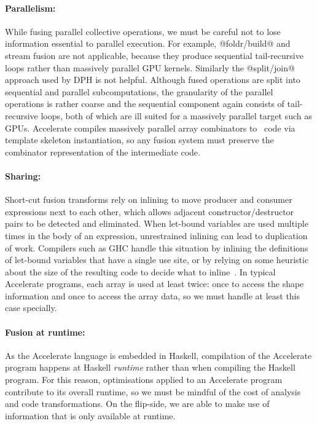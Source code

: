 \paragraph{Parallelism:} While fusing parallel collective operations, we must be
careful not to lose information essential to parallel execution. For example,
@foldr/build@ and stream
fusion are not applicable, because they produce sequential tail-recursive loops
rather than massively parallel GPU kernels. Similarly the
@split/join@ approach used by
DPH is not helpful. Although fused operations are
split into sequential and parallel subcomputations, the granularity of the
parallel operations is rather coarse and the sequential component again consists
of tail-recursive loops, both of which are ill suited for a massively parallel
target such as GPUs. Accelerate compiles
massively parallel array combinators to \CUDA\ code via template skeleton
instantiation, so any fusion system must preserve the combinator representation
of the intermediate code.

\paragraph{Sharing:} Short-cut fusion transforms rely on
inlining to move producer and consumer expressions next to each other, which
allows adjacent constructor/destructor pairs to be detected and eliminated. When
let-bound variables are used multiple times in the body of an expression,
unrestrained inlining can lead to duplication of work. Compilers such as GHC
handle this situation by inlining the definitions of let-bound variables that
have a single use site, or by relying on some heuristic about the size of the
resulting code to decide what to inline~\cite{PeytonJones:2003gb}. In typical
Accelerate programs, each array is used at least twice: once to access the shape
information and once to access the array data, so we must handle at least this
case specially.

\paragraph{Fusion at runtime:} As the Accelerate language is embedded in
Haskell, compilation of the Accelerate program happens at Haskell
\emph{runtime} rather than when compiling the Haskell program. For this reason,
optimisations applied to an Accelerate program contribute to its overall
runtime, so we must be mindful of the cost of analysis and code transformations.
On the flip-side, we are able to make use of information that is only available
at runtime.

